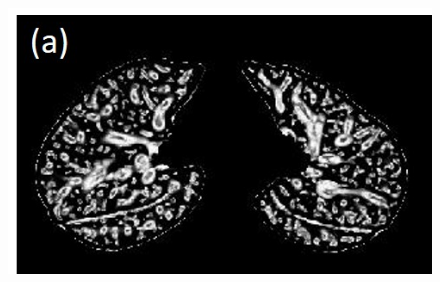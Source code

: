 \documentclass[]{spie}  %
\begin{document}
{\begin{figure}[htbp] 
\centering
\begin{subfigure}{
  \begin{minipage}[t]{0.295\linewidth}
  \includegraphics[width=\linewidth,trim={{.0\wd0} {.0\wd0} {.0\wd0} {.0\wd0}},clip]{Image/FissureDetection1.jpg} %
  \centerline{}
	\label{fig:FissureDetection-a}
	\end{minipage}%
   }%
\end{subfigure} 
\begin{subfigure}{
  \begin{minipage}[t]{0.288\linewidth}

\end{minipage}}
\end{subfigure}
\end{figure}}
\end{document}
